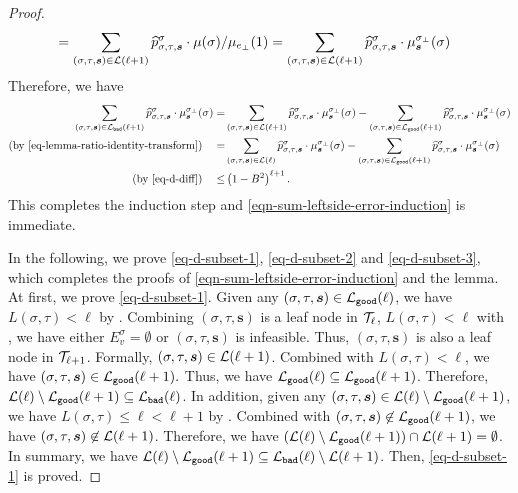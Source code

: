 \documentclass[11pt]{article}
\def\!#1{\mathtt{#1}}
\newcommand{\seqS}{\boldsymbol{s}}
\begin{document}
\begin{proof}
\begin{equation}
\begin{aligned}
    &= \sum_{(\sigma,\tau, \seqS)\in \+L(\ell+1)}\widehat{p}^{\sigma}_{\sigma,\tau,\seqS}\cdot \mu(\sigma)/\mu_{e_{\bot}}(1) =  \sum_{(\sigma,\tau, \seqS)\in \+L(\ell+1)} \widehat{p}^{\sigma}_{\sigma,\tau,\seqS}\cdot \mu^{\sigma_{\bot}}_{\seqS}(\sigma)
\end{aligned}
\end{equation}
Therefore, we have
\begin{align*}
    \sum_{(\sigma,\tau, \seqS)\in \+L_{\!{bad}}(\ell+1)} \widehat{p}^{\sigma}_{\sigma,\tau,\seqS}\cdot \mu^{\sigma_{\bot}}_{\seqS}(\sigma)
    =&\sum_{(\sigma,\tau, \seqS)\in \+L(\ell+1)} \widehat{p}^{\sigma}_{\sigma,\tau,\seqS}\cdot \mu^{\sigma_{\bot}}_{\seqS}(\sigma) - \sum_{(\sigma,\tau, \seqS)\in \+L_{\!{good}}(\ell+1)}\widehat{p}^{\sigma}_{\sigma,\tau,\seqS}\cdot \mu^{\sigma_{\bot}}_{\seqS}(\sigma) \\
\left(\text{by \eqref{eq-lemma-ratio-identity-transform}}\right) \quad      =&\sum_{(\sigma,\tau, \seqS)\in \+L(\ell)} \widehat{p}^{\sigma}_{\sigma,\tau,\seqS}\cdot \mu^{\sigma_{\bot}}_{\seqS}(\sigma) - \sum_{(\sigma,\tau, \seqS)\in \+L_{\!{good}}(\ell+1)}\widehat{p}^{\sigma}_{\sigma,\tau,\seqS}\cdot \mu^{\sigma_{\bot}}_{\seqS}(\sigma)\\
\left(\text{by \eqref{eq-d-diff}}\right) \quad  \leq &\left(1-B^2\right)^{\ell+1}.
\end{align*}
This completes the induction step and \eqref{eqn-sum-leftside-error-induction} is immediate.

In the following, we prove \eqref{eq-d-subset-1},  \eqref{eq-d-subset-2} and \eqref{eq-d-subset-3}, which completes the proofs of \eqref{eqn-sum-leftside-error-induction} and the lemma. 
At first, we prove \eqref{eq-d-subset-1}.
Given any $(\sigma,\tau,\seqS) \in \+L_{\!{good}}(\ell)$, we have $L(\sigma,\tau)<\ell$ by .
Combining $(\sigma,\tau,\seqS)$ is a leaf node in $\mathcal{T}_{\ell}$, $L(\sigma,\tau)<\ell$ with ,
we have either $E_v^{\sigma}=\emptyset$ or $(\sigma, \tau, \seqS)$ is infeasible.
Thus, $(\sigma, \tau, \seqS)$ is also a leaf node in $\mathcal{T}_{\ell+1}$.
Formally, $(\sigma,\tau,\seqS)\in \+L(\ell+1)$.
Combined with $L(\sigma,\tau)<\ell$, 
we have 
$(\sigma, \tau, \seqS)\in \+L_{\!{good}}(\ell+1).$
Thus, we have 
$\+L_{\!{good}}(\ell)\subseteq \+L_{\!{good}}(\ell+1)$.
Therefore, 
$\+L(\ell)\setminus \+L_{\!{good}}(\ell+1)\subseteq \+L_{\!{bad}}(\ell)$.
In addition, given any $(\sigma,\tau,\seqS)\in \+L(\ell)\setminus \+L_{\!{good}}(\ell+1)$, we have $L(\sigma,\tau)\leq \ell < \ell+1$ by .
Combined with $(\sigma,\tau,\seqS)\not \in \+L_{\!{good}}(\ell+1)$,
we have $(\sigma,\tau,\seqS)\not\in \+L(\ell+1)$.
Therefore, we have
$(\+L(\ell)\setminus \+L_{\!{good}}(\ell+1))\cap \+L(\ell+1) = \emptyset$.
In summary, we have $\+L(\ell)\setminus \+L_{\!{good}}(\ell+1) \subseteq \+L_{\!{bad}}(\ell)\setminus \+L(\ell+1)$.
Then, \eqref{eq-d-subset-1} is proved.


\end{proof}
\end{document}
